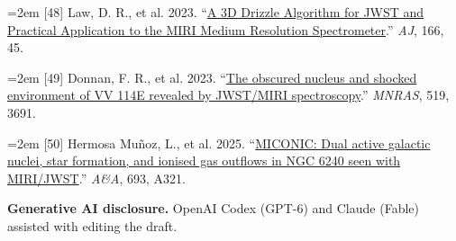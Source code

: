 \documentclass[12pt]{article}
\begin{document}
\noindent\hangindent=2em [48] Law, D. R., et al. 2023. ``\href{https://doi.org/10.3847/1538-3881/acdddc}{A 3D Drizzle Algorithm for JWST and Practical Application to the MIRI Medium Resolution Spectrometer}.'' \emph{AJ}, 166, 45.\par
\noindent\hangindent=2em [49] Donnan, F. R., et al. 2023. ``\href{https://doi.org/10.1093/mnras/stac3729}{The obscured nucleus and shocked environment of VV 114E revealed by JWST/MIRI spectroscopy}.'' \emph{MNRAS}, 519, 3691.\par
\noindent\hangindent=2em [50] Hermosa Mu\~noz, L., et al. 2025. ``\href{https://doi.org/10.1051/0004-6361/202452437}{MICONIC: Dual active galactic nuclei, star formation, and ionised gas outflows in NGC 6240 seen with MIRI/JWST}.'' \emph{A\&A}, 693, A321.\par

\noindent\textbf{Generative AI disclosure.} OpenAI Codex (GPT-6) and Claude (Fable) assisted with editing the draft.\par
\templateversion
\end{document}
